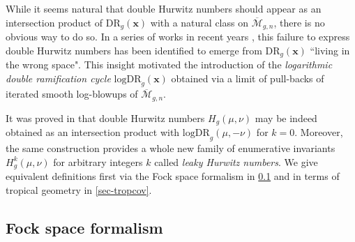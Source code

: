 \documentclass[10pt,a4paper,oneside,no-math,reqno]{amsart}%
\theoremstyle{plain}
\theoremstyle{definition}
\theoremstyle{remark}
\numberwithin{equation}{section}
\newcommand{\1}{\mathds{1}}
\newcommand{\<}{\langle}
\renewcommand{\>}{\rangle}
\begin{document}
While it seems natural that double Hurwitz numbers should appear as an intersection product of $\mathrm{DR}_g(\mathbf{x})$ with a natural class on $\overline{\mathcal{M}}_{g,n}$, there is no obvious way to do so. In a series of works in recent years \cite{Hol21,MW20}, this failure to express double Hurwitz numbers has been identified to emerge from $\mathrm{DR}_g(\mathbf{x})$ ``living in the wrong space". This insight motivated the introduction of the \textit{logarithmic double ramification cycle} $\mathrm{logDR}_g(\mathbf{x})$ obtained via a limit of pull-backs of iterated smooth log-blowups of $\overline{\mathcal{M}}_{g,n}$.

It was proved in \cite{CMR25} that double Hurwitz numbers $H_g(\mu,\nu)$ may be indeed obtained as an intersection product with $\mathrm{logDR}_g(\mu,-\nu)$ for $k=0$. Moreover, the same construction provides a whole new family of enumerative invariants $H_g^k(\mu,\nu)$ for arbitrary integers $k$ called \textit{leaky Hurwitz numbers}. We give equivalent definitions first via the Fock space formalism in \cref{FockSpace} and in terms of tropical geometry in \cref{sec-tropcov}.



\subsection{Fock space formalism}\label{FockSpace}
\end{document}
